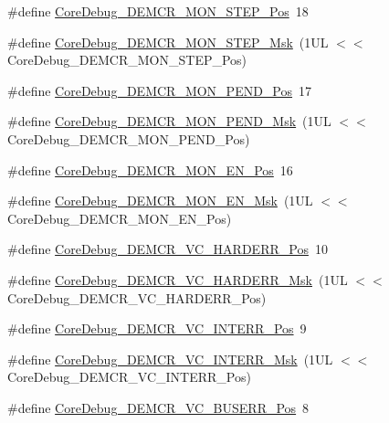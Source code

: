 \begin{DoxyCompactItemize}
\item 
\#define \hyperlink{group__CMSIS__CoreDebug_ga9ae10710684e14a1a534e785ef390e1b}{Core\-Debug\-\_\-\-D\-E\-M\-C\-R\-\_\-\-M\-O\-N\-\_\-\-S\-T\-E\-P\-\_\-\-Pos}~18
\item 
\#define \hyperlink{group__CMSIS__CoreDebug_ga2ded814556de96fc369de7ae9a7ceb98}{Core\-Debug\-\_\-\-D\-E\-M\-C\-R\-\_\-\-M\-O\-N\-\_\-\-S\-T\-E\-P\-\_\-\-Msk}~(1\-U\-L $<$$<$ Core\-Debug\-\_\-\-D\-E\-M\-C\-R\-\_\-\-M\-O\-N\-\_\-\-S\-T\-E\-P\-\_\-\-Pos)
\item 
\#define \hyperlink{group__CMSIS__CoreDebug_ga1e2f706a59e0d8131279af1c7e152f8d}{Core\-Debug\-\_\-\-D\-E\-M\-C\-R\-\_\-\-M\-O\-N\-\_\-\-P\-E\-N\-D\-\_\-\-Pos}~17
\item 
\#define \hyperlink{group__CMSIS__CoreDebug_ga68ec55930269fab78e733dcfa32392f8}{Core\-Debug\-\_\-\-D\-E\-M\-C\-R\-\_\-\-M\-O\-N\-\_\-\-P\-E\-N\-D\-\_\-\-Msk}~(1\-U\-L $<$$<$ Core\-Debug\-\_\-\-D\-E\-M\-C\-R\-\_\-\-M\-O\-N\-\_\-\-P\-E\-N\-D\-\_\-\-Pos)
\item 
\#define \hyperlink{group__CMSIS__CoreDebug_ga802829678f6871863ae9ecf60a10425c}{Core\-Debug\-\_\-\-D\-E\-M\-C\-R\-\_\-\-M\-O\-N\-\_\-\-E\-N\-\_\-\-Pos}~16
\item 
\#define \hyperlink{group__CMSIS__CoreDebug_gac2b46b9b65bf8d23027f255fc9641977}{Core\-Debug\-\_\-\-D\-E\-M\-C\-R\-\_\-\-M\-O\-N\-\_\-\-E\-N\-\_\-\-Msk}~(1\-U\-L $<$$<$ Core\-Debug\-\_\-\-D\-E\-M\-C\-R\-\_\-\-M\-O\-N\-\_\-\-E\-N\-\_\-\-Pos)
\item 
\#define \hyperlink{group__CMSIS__CoreDebug_gaed9f42053031a9a30cd8054623304c0a}{Core\-Debug\-\_\-\-D\-E\-M\-C\-R\-\_\-\-V\-C\-\_\-\-H\-A\-R\-D\-E\-R\-R\-\_\-\-Pos}~10
\item 
\#define \hyperlink{group__CMSIS__CoreDebug_ga803fc98c5bb85f10f0347b23794847d1}{Core\-Debug\-\_\-\-D\-E\-M\-C\-R\-\_\-\-V\-C\-\_\-\-H\-A\-R\-D\-E\-R\-R\-\_\-\-Msk}~(1\-U\-L $<$$<$ Core\-Debug\-\_\-\-D\-E\-M\-C\-R\-\_\-\-V\-C\-\_\-\-H\-A\-R\-D\-E\-R\-R\-\_\-\-Pos)
\item 
\#define \hyperlink{group__CMSIS__CoreDebug_ga22079a6e436f23b90308be97e19cf07e}{Core\-Debug\-\_\-\-D\-E\-M\-C\-R\-\_\-\-V\-C\-\_\-\-I\-N\-T\-E\-R\-R\-\_\-\-Pos}~9
\item 
\#define \hyperlink{group__CMSIS__CoreDebug_gad6815d8e3df302d2f0ff2c2c734ed29a}{Core\-Debug\-\_\-\-D\-E\-M\-C\-R\-\_\-\-V\-C\-\_\-\-I\-N\-T\-E\-R\-R\-\_\-\-Msk}~(1\-U\-L $<$$<$ Core\-Debug\-\_\-\-D\-E\-M\-C\-R\-\_\-\-V\-C\-\_\-\-I\-N\-T\-E\-R\-R\-\_\-\-Pos)
\item 
\#define \hyperlink{group__CMSIS__CoreDebug_gab8e3d8f0f9590a51bbf10f6da3ad6933}{Core\-Debug\-\_\-\-D\-E\-M\-C\-R\-\_\-\-V\-C\-\_\-\-B\-U\-S\-E\-R\-R\-\_\-\-Pos}~8
$$
\end{DoxyCompactItemize}
